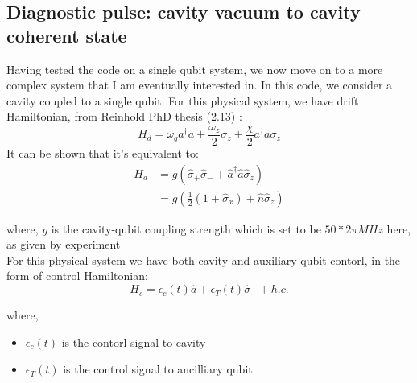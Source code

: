 \documentclass[12pt]{article}
\begin{document}



\subsection{Diagnostic pulse: cavity vacuum to cavity coherent state}
Having tested the code on a single qubit system, we now move on to a more complex system that I am eventually interested in. 
In this code, we consider a cavity coupled to a single qubit.
For this physical system, we have drift Hamiltonian, 
from Reinhold PhD thesis (2.13) \cite{reinhold2019}: 
\begin{equation}
    H_d = \omega_q a^\dagger a + \frac{\omega_z}{2} \sigma_z + \frac{\chi}{2} a^\dagger a \sigma_z
\end{equation}
It can be shown that it's equivalent to: %
\begin{equation}
    \begin{aligned}
    H_d &= g\left( \hat{\sigma}_+ \hat{\sigma}_- + \hat{a}^{\dagger}\hat{a}\hat{\sigma}_z \right) \\
    &= g \left( \frac{1}{2}(1+\hat{\sigma}_x) + \hat{n}\hat{\sigma}_z\right)
\end{aligned}
\end{equation}

where, $g$ is the cavity-qubit coupling strength which is set to be $50*2 \pi MHz$ here, as given by experiment
\\
For this physical system we have both cavity and auxiliary qubit contorl, in the form of control Hamiltonian: 
\begin{equation}
    H_c = \epsilon_c(t) \hat{a} + \epsilon_T(t) \hat{\sigma}_- + h.c.
\end{equation}

where, 
\begin{itemize}
    \item $\epsilon_c(t)$ is the contorl signal to cavity
    \item $\epsilon_T(t)$ is the control signal to ancilliary qubit
\end{itemize} 
\end{document}
